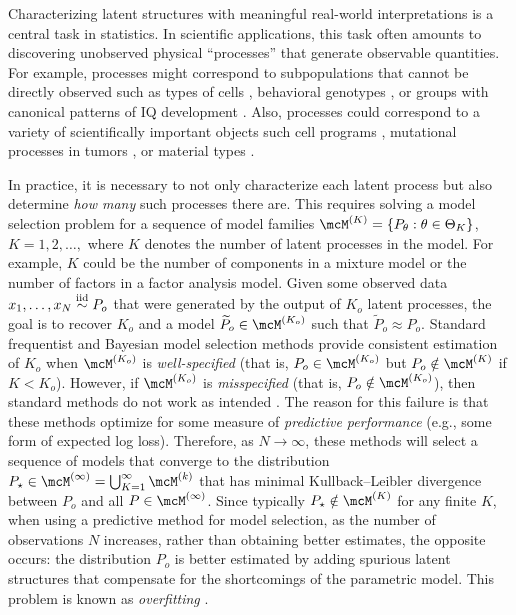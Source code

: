 Characterizing latent structures with meaningful real-world interpretations is a central task in statistics.
In scientific applications, this task often amounts to discovering unobserved physical ``processes'' that generate observable quantities.
For example, processes might correspond to subpopulations that cannot be directly observed such as
types of cells \citep{Gorsky:2020,Prabhakaran:2016}, behavioral genotypes \citep{Stevens:2019}, or
groups with canonical patterns of IQ development \citep{Bauer:2007}.
Also, processes could correspond to a variety of scientifically important objects such cell programs \citep{Kotliar_Identify_Cell_Idendity_Activity_NMF_2019,Buettner_FscLVM_ScalableVersatile_FA_2017,Risso_General_Flexible_Signal_Extract_2018},
mutational processes in tumors %
\citep{Levitin_DeNovo_Gene_Signature_Identification_2019,Kinker_Pan_Cancer_2020,Seplyarskiy_PopulationSequencingData_2021},
or material types
\citep{Fevotte_NonlinearHyperspectralUnmixing_2015,Rajabi_SpectralUnmixingHyperspectral_2015}.

In practice, it is necessary to not only characterize each latent process but also determine \emph{how many} such processes there are.
This requires solving a model selection problem for a sequence of model families $\model{K} = \{ P_\theta : \theta \in \Theta_K\}$, $K = 1, 2, \dots,$ where $K$ denotes the number of latent processes in the model.
For example, $K$ could be the number of components in a mixture model or the number of factors in a factor analysis model.
Given some observed data $x_{1},\dots, x_{N} \stackrel{\text{iid}}{\sim} P_o$ that were generated by the output of $K_{o}$ latent processes,
the goal is to recover $K_{o}$ and a model $\widetilde{P}_o \in \model{K_{o}}$ such that $\widetilde{P}_o  \approx P_{o}$.
Standard frequentist and Bayesian model selection methods provide consistent estimation of $K_o$ when $\model{K_o}$ is \emph{well-specified} (that is, $P_o \in \model{K_o}$ but $P_o \notin \model{K}$ if $K < K_o$).
However, if $\model{K_o}$ is \emph{misspecified} (that is, $P_o \notin \model{K_o}$), then standard methods do not work as intended
\citep{Cai:2021,Guha:2021,Fruhwurth:2006,Miller:2019,Xue:2024}.
The reason for this failure is that these methods optimize for some measure of \emph{predictive performance} (e.g., some form of expected log loss).
Therefore, as $N \to \infty$, these methods will select a sequence of models that converge to the distribution $P_\star
	\in \model{\infty} = \bigcup_{K=1}^\infty \model{k}$ that has minimal Kullback--Leibler divergence between $P_o$ and all $P \in \model{\infty}$.
Since typically $P_\star \notin \model{K}$ for any finite $K$, when using a predictive method for
model selection, as the number of observations $N$ increases, rather than obtaining better estimates, the opposite occurs:
the distribution $P_o$ is better estimated by adding spurious latent structures that compensate for the shortcomings of the parametric model.
This problem is known as \emph{overfitting}  \citep{Cai:2021}. %

